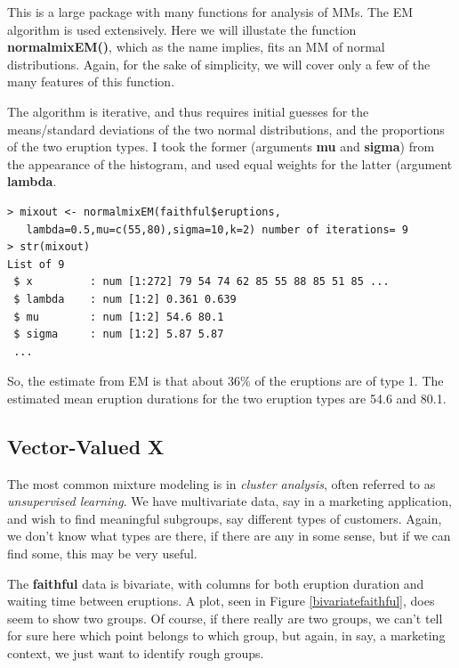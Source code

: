 \documentclass[11pt]{article}
\begin{document}
This is a large package with many functions for analysis of MMs.  The EM
algorithm is used extensively.  Here we will illustate the function
\textbf{normalmixEM()}, which as the name implies, fits an MM of normal
distributions.  Again, for the sake of simplicity, we will cover only a
few of the many features of this function.

The algorithm is iterative, and thus requires initial guesses for the
means/standard deviations of the two normal distributions, and the
proportions of the two eruption types.  I took the former (arguments
\textbf{mu} and \textbf{sigma}) from the appearance of the histogram,
and used equal weights for the latter (argument \textbf{lambda}.

\begin{lstlisting}
> mixout <- normalmixEM(faithful$eruptions,
   lambda=0.5,mu=c(55,80),sigma=10,k=2) number of iterations= 9 
> str(mixout)
List of 9
 $ x         : num [1:272] 79 54 74 62 85 55 88 85 51 85 ...
 $ lambda    : num [1:2] 0.361 0.639
 $ mu        : num [1:2] 54.6 80.1
 $ sigma     : num [1:2] 5.87 5.87
 ...
\end{lstlisting}

So, the estimate from EM is that about 36\% of the eruptions are of type
1.  The estimated mean eruption durations for the two eruption types
are 54.6 and 80.1.

\subsection{Vector-Valued X}

The most common mixture modeling is in \textit{cluster analysis}, often
referred to as \textit{unsupervised learning}.  We have multivariate
data, say in a marketing application, and wish to find meaningful
subgroups, say different types of customers.  Again, we don't know what
types are there, if there are any in some sense, but if we can find
some, this may be very useful.

The \textbf{faithful} data is bivariate, with columns for both eruption
duration and waiting time between eruptions.  A plot, seen in Figure
\ref{bivariatefaithful}, does seem to show two groups.  Of course, if
there really are two groups, we can't tell for sure here which point
belongs to which group, but again, in say, a marketing context, we just
want to identify rough groups.  
\end{document}
